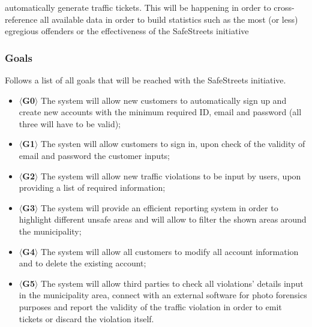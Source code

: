 \documentclass{article}
\begin{document}
    automatically generate traffic tickets. This will be happening in order to
    cross-reference all available data in order to build statistics such as the
    most (or less) egregious offenders or the effectiveness of the SafeStreets
    initiative \subsubsection{Goals} Follows a list of all goals that will be
    reached with the SafeStreets initiative.
    \begin{itemize}
        \item $\langle$\textbf{G0}$\rangle$ The system will allow new customers to
        automatically sign up and create new accounts with the minimum required
        ID, email and password (all three will have to be valid);
        \item $\langle$\textbf{G1}$\rangle$ The systen will allow customers to
        sign in, upon check of the validity of email and password the customer
        inputs;
        \item $\langle$\textbf{G2}$\rangle$ The system will allow new traffic
        violations to be input by users, upon providing a list of required
        information;
        \item $\langle$\textbf{G3}$\rangle$ The system will provide an efficient
        reporting system in order to highlight different unsafe areas and will
        allow to filter the shown areas around the municipality; 
        \item $\langle$\textbf{G4}$\rangle$ The system will allow all customers
        to modify all account information and to delete the existing account; 
        \item $\langle$\textbf{G5}$\rangle$ The system will allow third parties
        to check all violations' details input in the municipality area, connect
        with an external software for photo forensics purposes and report the
        validity of the traffic violation in order to emit tickets or discard
        the violation itself.
    \end{itemize}
\end{document}
